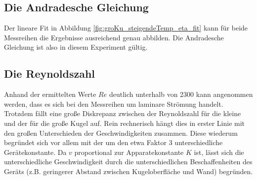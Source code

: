 
\subsection[]{Die Andradesche Gleichung}
Der lineare Fit in Abbildung \ref{fig:groKu_steigendeTemp_eta_fit} kann für beide Messreihen die
Ergebnisse ausreichend genau abbilden. 
Die Andradesche Gleichung ist also in diesem Experiment gültig.

\subsection[]{Die Reynoldszahl}
Anhand der ermittelten Werte $Re$ deutlich unterhalb von 2300 kann angenommen werden, dass es sich bei den Messreihen um laminare Strömung handelt.
Trotzdem fällt eine große Diskrepanz zwischen der Reynoldszahl für die kleine und der für die große Kugel auf.
Rein rechnerisch hängt dies in erster Linie mit den großen Unterschieden der Geschwindigkeiten zusammen.
Diese wiederum begründet sich vor allem mit der um den etwa Faktor 3 unterschiedliche Gerätekonstante.
Da $v$ proportional zur Apparatekonstante $K$ ist, lässt sich die unterschiedliche Geschwindigkeit 
durch die unterschiedlichen Beschaffenheiten des Geräts (z.B. geringerer Abstand zwischen Kugeloberfläche und Wand) begründen.







